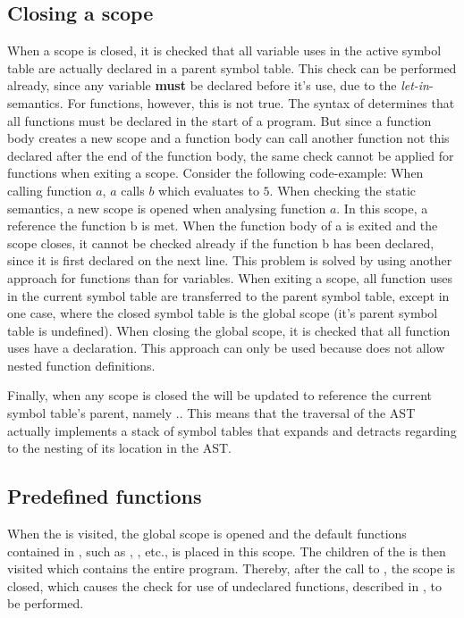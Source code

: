 \subsection{Closing a scope}
\label{sec:closescope}
When a scope is closed, it is checked that all variable uses in the active symbol table are actually declared in a parent symbol table. This check can be performed already, since any variable \textbf{must} be declared before it's use, due to the \emph{let-in}-semantics.
For functions, however, this is not true. The syntax of \productname{} determines that all functions must be declared in the start of a program. But since a function body creates a new scope and a function body can call another function not this declared after the end of the function body, the same check cannot be applied for functions when exiting a scope.
Consider the following \productname{} code-example:
When calling function $a$, $a$ calls $b$ which evaluates to $5$. When checking the static semantics, a new scope is opened when analysing function $a$. In this scope, a reference the function b is met. When the function body of a is exited and the scope closes, it cannot be checked already if the function b has been declared, since it is first declared on the next line. This problem is solved by using another approach for functions than for variables. When exiting a scope, all function uses in the current symbol table are transferred to the parent symbol table, except in one case, where the closed symbol table is the global scope (it's parent symbol table is undefined). When closing the global scope, it is checked that all function uses have a declaration. This approach can only be used because \productname{} does not allow nested function definitions.

Finally, when any scope is closed the  will be updated to reference the current symbol table's parent, namely .. This means that the traversal of the AST actually implements a stack of symbol tables that expands and detracts regarding to the nesting of its location in the AST.

\subsection{Predefined functions}
When the   is visited, the global scope is opened and the default functions contained in \productname{}, such as , , etc., is placed in this scope. The children of the  is then visited which contains the entire program. Thereby, after the call to , the scope is closed, which causes the check for use of undeclared functions, described in , to be performed.

